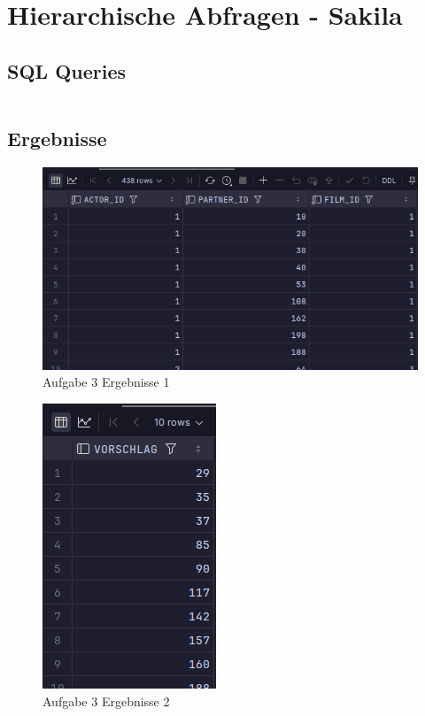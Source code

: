 \documentclass[12pt]{scrartcl}
\begin{document}
\pagebreak

\section{Hierarchische Abfragen - Sakila}

\subsection{SQL Queries}

\inputminted{sql}{../ue3_3.sql}

\subsection{Ergebnisse}

\begin{figure}[H]
	\centering
	\includegraphics[width=1\linewidth]{../ue3_3a.png}
	\caption{Aufgabe 3 Ergebnisse 1}
\end{figure}

\begin{figure}[H]
	\centering
	\includegraphics[width=0.3\linewidth]{../ue3_3b.png}
	\caption{Aufgabe 3 Ergebnisse 2}
\end{figure}
\end{document}
